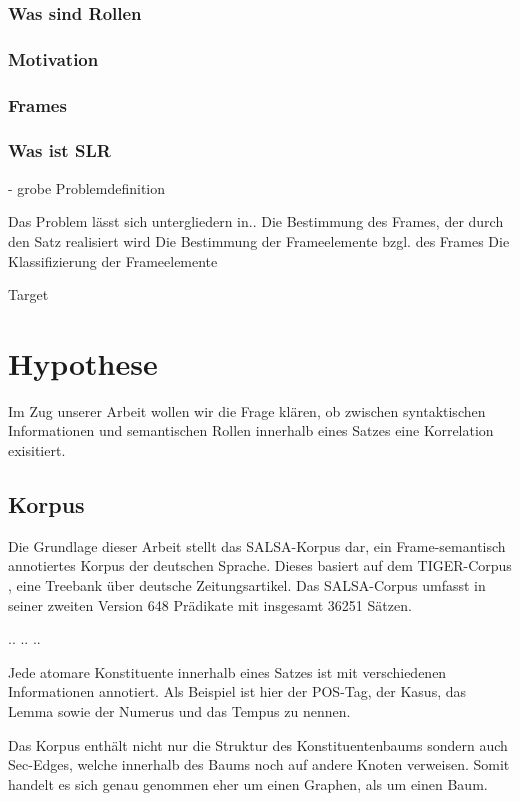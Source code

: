 \documentclass[12pt]{article}
\begin{document}
\subsubsection{Was sind Rollen}
\subsubsection{Motivation}
\subsubsection{Frames}
\subsubsection{Was ist SLR}
 - grobe Problemdefinition

Das Problem lässt sich untergliedern in..
Die Bestimmung des Frames, der durch den Satz realisiert wird
Die Bestimmung der Frameelemente bzgl. des Frames
Die Klassifizierung der Frameelemente


Target

\section{Hypothese}

Im Zug unserer Arbeit wollen wir die Frage klären, ob zwischen syntaktischen
Informationen und semantischen Rollen innerhalb eines Satzes eine Korrelation
exisitiert.

\subsection{Korpus}

Die Grundlage dieser Arbeit stellt das SALSA-Korpus \cite{rehbein_adding_2012}
dar, ein Frame-semantisch annotiertes Korpus der deutschen Sprache. Dieses
basiert auf dem TIGER-Corpus \cite{}, eine Treebank über deutsche
Zeitungsartikel. Das SALSA-Corpus umfasst in seiner zweiten Version 648
Prädikate mit insgesamt 36251 Sätzen.

.. .. ..

Jede atomare Konstituente innerhalb eines Satzes ist mit verschiedenen
Informationen annotiert. Als Beispiel ist hier der POS-Tag, der Kasus, das Lemma
sowie der Numerus und das Tempus zu nennen. 

Das Korpus enthält nicht nur die Struktur des Konstituentenbaums sondern auch
Sec-Edges, welche innerhalb des Baums noch auf andere Knoten verweisen. Somit handelt es sich
genau genommen eher um einen Graphen, als um einen Baum.
\end{document}
